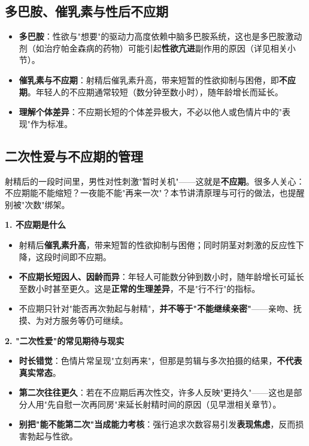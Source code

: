 \subsection{多巴胺、催乳素与性后不应期}

\begin{itemize}
	\item \textbf{多巴胺}：性欲与"想要"的驱动力高度依赖中脑多巴胺系统，这也是多巴胺激动剂（如治疗帕金森病的药物）可能引起\textbf{性欲亢进}副作用的原因（详见相关小节）。
	\item \textbf{催乳素与不应期}：射精后催乳素升高，带来短暂的性欲抑制与困倦，即\textbf{不应期}。年轻人的不应期通常较短（数分钟至数小时），随年龄增长而延长。
	\item \textbf{理解个体差异}：不应期长短的个体差异极大，不必以他人或色情片中的"表现"作为标准。
\end{itemize}

\subsection{二次性爱与不应期的管理}

射精后的一段时间里，男性对性刺激"暂时关机"——这就是\textbf{不应期}。很多人关心：不应期能不能缩短？一夜能不能"再来一次"？本节讲清原理与可行的做法，也提醒别被"次数"绑架。

\vspace{0.5em}
\noindent\textbf{1. 不应期是什么}

\begin{itemize}
	\item 射精后\textbf{催乳素升高}，带来短暂的性欲抑制与困倦；同时阴茎对刺激的反应性下降，这段时间即不应期。
	\item \textbf{不应期长短因人、因龄而异}：年轻人可能数分钟到数小时，随年龄增长可延长至数小时甚至更久。这是\textbf{正常的生理差异}，不是"行不行"的指标。
	\item 不应期只针对"能否再次勃起与射精"，\textbf{并不等于"不能继续亲密"}——亲吻、抚摸、为对方服务等仍可继续。
\end{itemize}

\noindent\textbf{2. "二次性爱"的常见期待与现实}

\begin{itemize}
	\item \textbf{时长错觉}：色情片常呈现"立刻再来"，但那是剪辑与多次拍摄的结果，\textbf{不代表真实常态}。
	\item \textbf{第二次往往更久}：若在不应期后再次性交，许多人反映"更持久"——这也是部分人用"先自慰一次再同房"来延长射精时间的原因（见早泄相关章节）。
	\item \textbf{别把"能不能第二次"当成能力考核}：强行追求次数容易引发\textbf{表现焦虑}，反而损害勃起与性欲。
\end{itemize}

